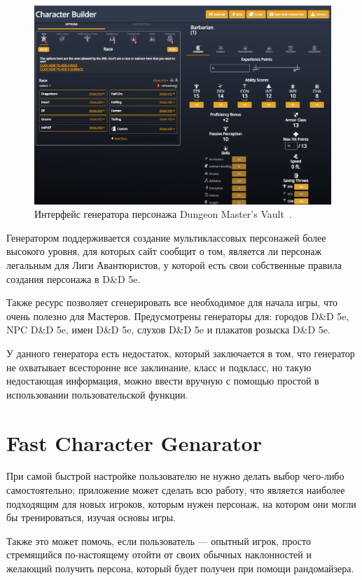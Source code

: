 \begin{figure}[H]
    \centering
    \includegraphics[scale=0.4]{Dungeon_Master's_Vault.png}
    \caption{Интерфейс генератора персонажа Dungeon Master's Vault~\cite{dmv}.}
    \label{fig:DM_Vault}
\end{figure}

Генератором поддерживается создание мультиклассовых персонажей более высокого уровня, для которых сайт сообщит о том, является ли персонаж легальным для Лиги Авантюристов, у которой есть свои собственные правила создания персонажа в D\&D 5e.

Также ресурс позволяет сгенерировать все необходимое для начала игры, что очень полезно для Мастеров. Предусмотрены генераторы для: городов D\&D 5e, NPC D\&D 5e, имен D\&D 5e, слухов D\&D 5e и плакатов розыска D\&D 5e.

У данного генератора есть недостаток, который заключается в том, что генератор не охватывает всесторонне все заклинание, класс и подкласс, но такую недостающая информация, можно ввести вручную с помощью простой в использовании пользовательской функции.

\section{Fast Character Genarator}

При самой быстрой настройке пользователю не нужно делать выбор чего-либо самостоятельно; приложение может сделать всю работу, что является наиболее подходящим для новых игроков, которым нужен персонаж, на котором они могли бы тренироваться, изучая основы игры.

Также это может помочь, если пользователь --- опытный игрок, просто стремящийся по-настоящему отойти от своих обычных наклонностей и желающий получить персона, который будет получен при помощи рандомайзера.

